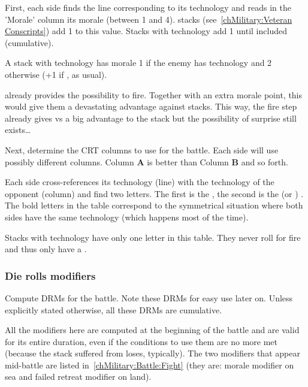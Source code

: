 

First, each side finds the line corresponding to its technology and reads in
the 'Morale' column its morale (between 1 and 4).  stacks
(see~\ref{chMilitary:Veteran Conscripts}) add 1 to this value. Stacks with
\TTER technology add 1 until \TARQ included (cumulative).

A stack with \TREN technology has morale 1 if the enemy has \TMED technology
and 2 otherwise (+1 if , as usual).

\begin{designnote}
  \TREN already provides the possibility to fire. Together with an extra
  morale point, this would give them a devastating advantage against \TMED
  stacks. This way, the fire step already gives \TREN vs \TMED a big advantage
  to the \TREN stack but the possibility of surprise still exists\ldots
\end{designnote}

Next, determine the CRT columns to use for the battle. Each side will use
possibly different columns. Column \textbf{A} is better than Column \textbf{B}
and so forth.

Each side cross-references its technology (line) with the technology of the
opponent (column) and find two letters. The first is the , the second is the  (or ) . The bold letters in the table correspond to the symmetrical
situation where both sides have the same technology (which happens most of the
time).

Stacks with \TMED technology have only one letter in this table. They never
roll for fire and thus only have a .

\subsubsection{Die rolls modifiers}
\label{chMilitary:Battle:Parameters:DRM}
Compute DRMs for the battle. Note these DRMs for easy use later on. Unless
explicitly stated otherwise, all these DRMs are cumulative.

All the modifiers here are computed at the beginning of the battle and are
valid for its entire duration, even if the conditions to use them are no more
met (because the stack suffered from loses, typically). The two modifiers that
appear mid-battle are listed in~\ref{chMilitary:Battle:Fight} (they are:
morale modifier on sea and failed retreat modifier on land).

